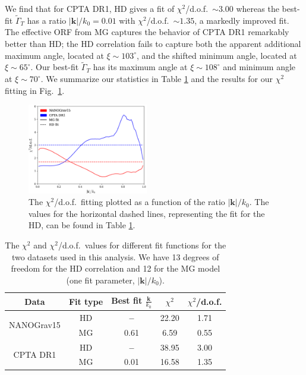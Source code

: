 \documentclass[10pt,prd,twocolumn,aps,nofootinbib,nobibnotes,superscriptaddress,preprintnumbers]{revtex4-2}
\begin{document}
We find that for CPTA DR1, HD gives a fit of $\chi^2$/d.o.f.\ $\sim 3.00$ whereas the best-fit $\tilde{\Gamma}_T$ has a ratio $|\boldsymbol{k}|/k_0 = 0.01$ with $\chi^2$/d.o.f.\ $\sim 1.35$, a markedly improved fit. The effective ORF from MG captures the behavior of CPTA DR1 remarkably better than HD; the HD correlation fails to capture both the apparent additional maximum angle, located at $\xi \sim 103^\circ$, and the shifted minimum angle, located at $\xi \sim 65^\circ$. Our best-fit $\tilde{\Gamma}_T$ has its maximum angle at $\xi \sim 108^\circ$ and minimum angle at $\xi \sim 70^\circ$. We summarize our statistics in Table \ref{tbl:chi} and the results for our $\chi^2$ fitting in Fig.~\ref{fig:chi}.
\begin{figure}[ht]
    \centering
    \includegraphics[width=0.47\textwidth]{fig3.pdf}
    \caption{The $\chi^2$/d.o.f.~fitting plotted as a function of the ratio $|\boldsymbol{k}|/k_0$. The values for the horizontal dashed lines, representing the fit for the HD, can be found in Table \ref{tbl:chi}.}
    \label{fig:chi}
\end{figure}
\begin{table}[ht]
\centering
\renewcommand{\arraystretch}{1.8}
\begin{tabular}{|c|c|c|c|c|}
\hline
\textbf{Data} & \textbf{Fit type} & \textbf{Best fit} $\frac{\boldsymbol{k}}{k_0}$ & \textbf{$\chi^2$} & \textbf{$\chi^2$/d.o.f.} \\
\hline
\multirow{2}{*}{NANOGrav15} & HD & \textbf{--}  & 22.20 & 1.71 \\ \cline{2-5}
                           & MG & 0.61 & 6.59  & 0.55 \\ 
\hline
\multirow{2}{*}{CPTA DR1}  & HD & \textbf{--} & 38.95 & 3.00 \\ \cline{2-5}
                           & MG & 0.01 & 16.58 & 1.35 \\ 
\hline
\end{tabular}
\caption{The $\chi^2$ and $\chi^2$/d.o.f.\ values for different fit functions for the two datasets used in this analysis. We have 13 degrees of freedom for the HD correlation and 12 for the MG model (one fit parameter, $|\boldsymbol{k}|/k_0$).}
\label{tbl:chi}
\end{table}
\end{document}
